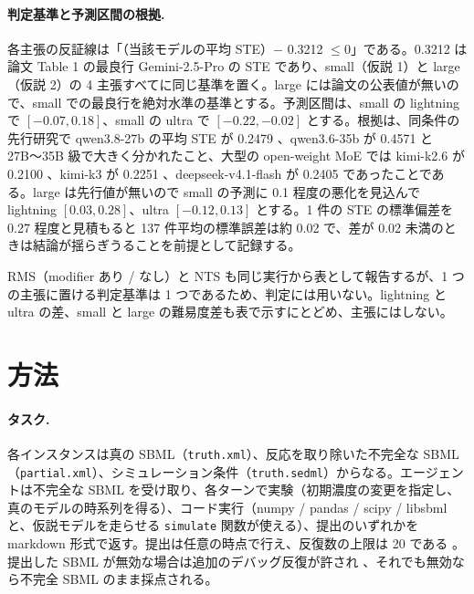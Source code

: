 \documentclass{article}
\providecommand{\unverified}[1]{#1}
\begin{document}


\paragraph{判定基準と予測区間の根拠.}
各主張の反証線は「（当該モデルの平均 STE）$-$ \unverified{0.3212} $\le 0$」である。\unverified{0.3212} は論文 Table 1 の最良行 Gemini-2.5-Pro の STE \cite[s1.p5]{duan-2025-measuring} であり、small（仮説 1）と large（仮説 2）の 4 主張すべてに同じ基準を置く。large には論文の公表値が無いので、small での最良行を絶対水準の基準とする。予測区間は、small の lightning で $[-0.07, 0.18]$、small の ultra で $[-0.22, -0.02]$ とする。根拠は、同条件の先行研究で qwen3.8-27b の平均 STE が \unverified{0.2479} \cite[s3.p5]{scigymrikyuopenmodels-2026-scigym}、qwen3.6-35b が \unverified{0.4571} \cite[s3.p6]{scigymrikyuopenmodels-2026-scigym} と 27B〜35B 級で大きく分かれたこと、大型の open-weight MoE では kimi-k2.6 が \unverified{0.2100} \cite[s3.p2]{scigymrikyuopenmodels-2026-scigym}、kimi-k3 が \unverified{0.2251} \cite[s3.p3]{scigymrikyuopenmodels-2026-scigym}、deepseek-v4.1-flash が \unverified{0.2405} \cite[s3.p4]{scigymrikyuopenmodels-2026-scigym} であったことである。large は先行値が無いので small の予測に 0.1 程度の悪化を見込んで lightning $[0.03, 0.28]$、ultra $[-0.12, 0.13]$ とする。1 件の STE の標準偏差を 0.27 程度と見積もると 137 件平均の標準誤差は約 0.02 で、差が 0.02 未満のときは結論が揺らぎうることを前提として記録する。

RMS（modifier あり / なし）と NTS も同じ実行から表として報告するが、1 つの主張に置ける判定基準は 1 つであるため、判定には用いない。lightning と ultra の差、small と large の難易度差も表で示すにとどめ、主張にはしない。

\section{方法}
\label{sec:method}
\paragraph{タスク.}
各インスタンスは真の SBML（\texttt{truth.xml}）、反応を取り除いた不完全な SBML（\texttt{partial.xml}）、シミュレーション条件（\texttt{truth.sedml}）からなる。エージェントは不完全な SBML を受け取り、各ターンで実験（初期濃度の変更を指定し、真のモデルの時系列を得る）、コード実行（numpy / pandas / scipy / libsbml と、仮説モデルを走らせる \texttt{simulate} 関数が使える）、提出のいずれかを markdown 形式で返す。提出は任意の時点で行え、反復数の上限は 20 である \cite[s1.p3]{duan-2025-measuring}。提出した SBML が無効な場合は追加のデバッグ反復が許され \cite[s1.p4]{duan-2025-measuring}、それでも無効なら不完全 SBML のまま採点される。
\end{document}

